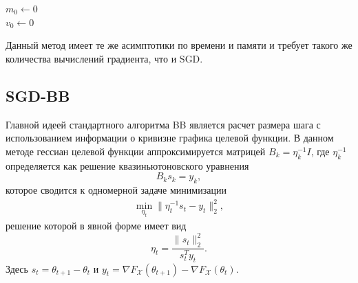 \documentclass[preprint,12pt]{elsarticle}
\begin{document}
{\begin{algorithm}[H]\label{Adam}
\caption {Adam все операции с векторами покомпонентные;\newline$\beta_i^{t+1}$ обозначает возведение числа $\beta_i$ в степень $t + 1$, $i \in \{1, 2\}$.}
\SetAlgoLined
\Input{Число итераций $N$ \newline
        Размер шага $\eta$ \newline
        Экспоненциальные скорости затухания $\beta_1, \beta_2 \in [0, 1)$ \newline
        Начальное приближение $\theta_0$ \newline
        Поправка на численную неустойчивость $\varepsilon$}
 $m_0 \leftarrow 0$\\
 $v_0 \leftarrow 0$\\
\end{algorithm}



Данный метод имеет те же асимптотики по времени и памяти и требует такого же количества вычислений градиента, что и SGD.

\subsection{SGD-BB}\label{SS:2.3}
Главной идеей стандартного алгоритма BB является расчет размера шага с использованием информации о кривизне графика целевой функции. 
В данном методе гессиан целевой функции аппроксимируется матрицей $B_k = \eta_k^{-1}I$, где $\eta_k^{-1}$ определяется как решение квазиньютоновского уравнения
\[
    B_ks_k = y_k,
\]
которое сводится к одномерной задаче минимизации
\begin{align*}
    \min_{\eta_{t}}\| \eta_t^{-1}s_{t}-y_{t}\|_2^2,
\end{align*}
решение которой в явной форме имеет вид
$$\eta_{t} = \frac{\|s_{t}\|_2^2}{s_{t}^Ty_{t}}.$$
Здесь $s_t = \theta_{t+1} - \theta_t$ и $y_t = \nabla F_\mathcal{X}(\theta_{t+1}) - \nabla F_\mathcal{X}(\theta_t)$.

}
\end{document}
